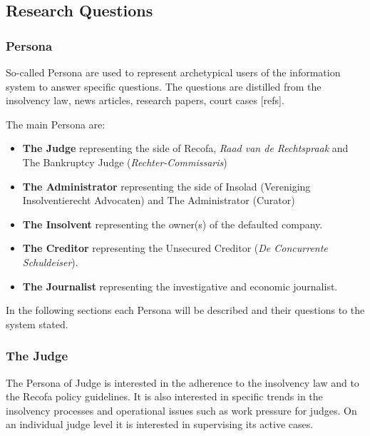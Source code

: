 \subsection{Research Questions}
\subsubsection{Persona}
So-called Persona are used to represent archetypical users of the information system to answer specific questions. The questions are distilled from the insolvency law, news articles, research papers, court cases [refs].

The main Persona are: 
\begin{itemize}
\item \textbf{The Judge} representing the side of Recofa, \textit{Raad van de Rechtspraak} and The Bankruptcy Judge (\textit{Rechter-Commissaris})
\item \textbf{The Administrator} representing the side of Insolad (Vereniging Insolventierecht Advocaten) and The Administrator (Curator) 
\item \textbf{The Insolvent} representing the owner(s) of the defaulted company.
\item \textbf{The Creditor} representing the Unsecured Creditor (\textit{De Concurrente Schuldeiser}).
\item \textbf{The Journalist} representing the investigative and economic journalist.
\end{itemize}

In the following sections each Persona will be described and their questions to the system stated.

\subsubsection{The Judge}
The Persona of Judge is interested in the adherence to the insolvency law and to the Recofa policy guidelines. It is also interested in specific trends in the insolvency processes and operational issues such as work pressure for judges. On an individual judge level it is interested in supervising its active cases.

